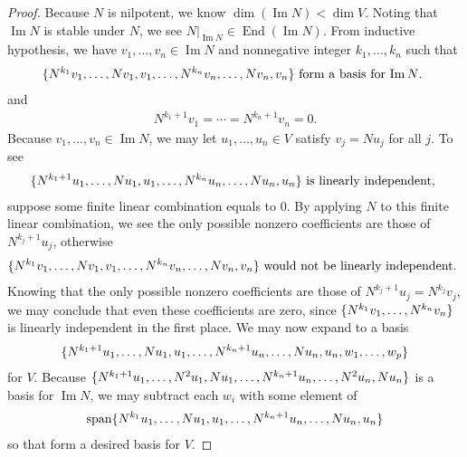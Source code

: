 \documentclass{report}
\begin{document}
\begin{proof}
Because $N$ is nilpotent, we know  $\operatorname{dim}(\operatorname{Im}N)< \operatorname{dim}V$. Noting that $\operatorname{Im}N$ is stable under $N$, we see $N|_{\operatorname{Im}N}\in \operatorname{End}(\operatorname{Im}N)$. From inductive hypothesis, we have $v_1,\dots ,v_n\in \operatorname{Im}N$ and nonnegative integer $k_1,\dots ,k_n$ such that 
\begin{align*}
  \{ N^{k_1}v_1,\dots ,Nv_1,v_1, \dots ,N^{k_n}v_n,\dots ,Nv_n,v_n \}\text{ form a basis for $\operatorname{Im}N$. }
\end{align*}
and 
\begin{align*}
N^{k_1+1}v_1=\cdots = N^{k_n+1}v_n=0. 
\end{align*}
Because $v_1,\dots ,v_n \in \operatorname{Im}N$, we may let $u_1,\dots ,u_n \in V$ satisfy $v_j=Nu_j$ for all  $j$. To see 
\begin{align}
\label{setn}
  \{ N^{k_1+1}u_1 ,\dots ,Nu_1,u_1, \dots ,N^{k_n}u_n,\dots ,Nu_n,u_n \}\text{ is linearly independent, }
\end{align}
suppose some finite linear combination equals to $0$. By applying $N$ to this finite linear combination, we see the only possible nonzero coefficients are those of $N^{k_j+1}u_j$, otherwise 
\begin{align*}
  \{ N^{k_1}v_1,\dots ,Nv_1,v_1,\dots ,N^{k_n}v_n,\dots ,Nv_n,v_n \}\text{ would not be linearly independent. }
\end{align*}
Knowing that the only possible nonzero coefficients are those of $N^{k_j+1}u_j=N^{k_j}v_j$, we may conclude that even these coefficients are zero, since $\{ N^{k_1}v_1,\dots ,N^{k_n}v_n \}$ is linearly independent in the first place. We may now expand  to a basis 
\begin{align}
\label{set1}
\{ N^{k_1+1}u_1,\dots ,Nu_1,u_1,\dots ,N^{k_n+1}u_n,\dots ,Nu_n,u_n,w_1,\dots ,w_p \}
\end{align}
for $V$. Because $\{ N^{k_1+1}u_1,\dots ,N^2u_1,Nu_1,\dots ,N^{k_n+1}u_n,\dots ,N^2u_n,Nu_n \}$ is a basis for  $\operatorname{Im}N$, we may subtract each $w_i$ with some element of 
\begin{align*}
\operatorname{span} \{ N^{k_1}u_1,\dots ,Nu_1,u_1,\dots , N^{k_n+1}u_n,\dots ,Nu_n,u_n \}
\end{align*}
so that   form a desired basis for $V$.    
\end{proof}
\end{document}
